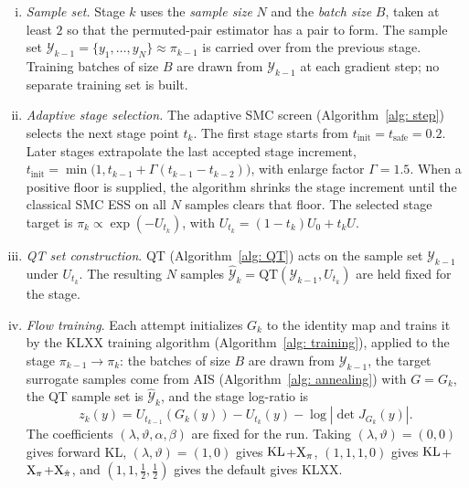 \documentclass{article}
\begin{document}
\begin{enumerate}[(i)]
\item \emph{Sample set.} Stage $k$ uses the \emph{sample size} $N$ and the \emph{batch size} $B$, taken at least $2$ so that the permuted-pair estimator has a pair to form. The sample set $\mathcal Y_{k-1}=\{y_1,\dots,y_N\}\approx\pi_{k-1}$ is carried over from the previous stage. Training batches of size $B$ are drawn from $\mathcal Y_{k-1}$ at each gradient step; no separate training set is built.

\item \emph{Adaptive stage selection.} The adaptive SMC screen (Algorithm~\ref{alg: step}) selects the next stage point $t_k$. The first stage starts from $t_{\mathrm{init}}=t_{\mathrm{safe}}=0.2$. Later stages extrapolate the last accepted stage increment, $t_{\mathrm{init}}=\min\bigl(1,t_{k-1}+\Gamma(t_{k-1}-t_{k-2})\bigr)$, with enlarge factor $\Gamma=1.5$. When a positive floor is supplied, the algorithm shrinks the stage increment until the classical SMC ESS on all $N$ samples clears that floor. The selected stage target is $\pi_k\propto\exp(-U_{t_k})$, with $U_{t_k}=(1-t_k)U_0+t_kU$.

\item \emph{QT set construction}. QT (Algorithm~\ref{alg: QT}) acts on the sample set $\mathcal Y_{k-1}$ under $U_{t_k}$. The resulting $N$ samples $\hat{\mathcal Y}_k=\mathrm{QT}(\mathcal Y_{k-1},U_{t_k})$ are held fixed for the stage.

\item \emph{Flow training}. Each attempt initializes $G_k$ to the identity map and trains it by the KLXX training algorithm (Algorithm~\ref{alg: training}), applied to the stage $\pi_{k-1}\to\pi_k$: the batches of size $B$ are drawn from $\mathcal Y_{k-1}$, the target surrogate samples come from AIS (Algorithm~\ref{alg: annealing}) with $G=G_k$, the QT sample set is $\hat{\mathcal Y}_k$, and the stage log-ratio is
\begin{equation*}
    z_k(y) = U_{t_{k-1}}(G_k(y)) - U_{t_k}(y) - \log|\det J_{G_k}(y)|.
\end{equation*}
The coefficients $(\lambda,\vartheta,\alpha,\beta)$ are fixed for the run. Taking $(\lambda,\vartheta)=(0,0)$ gives forward KL, $(\lambda,\vartheta)=(1,0)$ gives $\mathrm{KL}$+$\mathrm{X}_{\pi}$, $(1,1,1,0)$ gives $\mathrm{KL}$+$\mathrm{X}_\pi$+$\mathrm{X}_{\hat\pi}$, and $(1,1,\frac12,\frac12)$ gives the default gives KLXX.


\end{enumerate}
\end{document}
